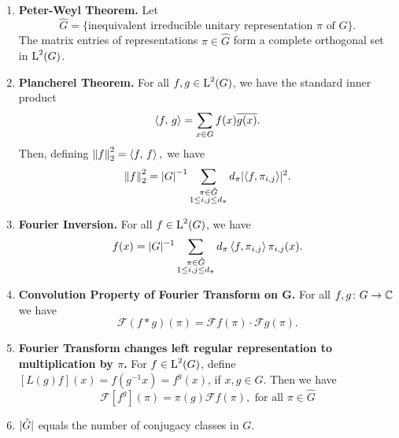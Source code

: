 \begin{theorem}~
\begin{enumerate}
\item \textbf{Peter-Weyl Theorem.} Let
\[\hat{G}=\{\text{inequivalent irreducible unitary representation $\pi$ of $G$}\}.\]
The matrix entries of representations $\pi\in\hat{G}$ form a complete orthogonal set in $\operatorname{L}^2(G)$.
\item \textbf{Plancherel Theorem.} For all $f,g\in \operatorname{L}^2(G)$, we have the standard inner product
\[
\braket{f,\,g}=\sum_{x\in G}f(x)\overline{g(x)}.
\]
Then, defining ${\left\lVert f\right\rVert}_2^2=\braket{f,\, f},$ we have 
\[
{\left\lVert f\right\rVert}_2^2={\lvert G\rvert}^{-1} \sum_{\substack{\pi \in \hat{G} \\1\leq i,j\leq d_\pi}}d_\pi \lvert\braket{f,\pi_{i,j}}\rvert^2.
\]
\item \textbf{Fourier Inversion.} For all $f\in \operatorname{L}^2(G)$, we have
\[
f(x)=\lvert G\rvert^{-1}\sum_{\substack{\pi \in \hat{G} \\1\leq i,j\leq d_\pi }}d_\pi\braket{f,\pi_{i,j}}\pi_{i,j}(x).
\]
\item \textbf{Convolution Property of Fourier Transform on G.} For all $f,g\colon G\rightarrow {\mathbb C}$ we have
\[
\mathscr{F}(f*g)(\pi)=\mathscr{F}f(\pi)\cdot \mathscr{F}g(\pi).
\]
\item \textbf{  Fourier Transform changes left regular representation to multiplication by $\pi$.} For $f\in \operatorname{L}^2(G)$, define $[L(g)f](x)=f(g^{-1}x)=f^g(x)$, if $x,g\in G$. Then we have 
\[
\mathscr{F}[f^g](\pi)=\pi(g)\mathscr{F}f(\pi), \text{ for all $\pi \in \hat{G}$}
\]  
\item $\lvert\hat{G}\rvert$ equals the number of conjugacy classes in $G$.
\end{enumerate}
\end{theorem}
